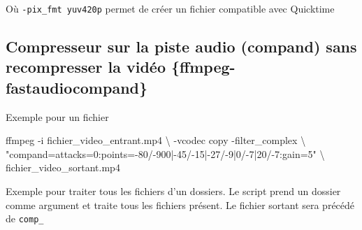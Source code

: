 \documentclass[
  french,
]{book}
\newenvironment{Shaded}{\begin{snugshade}}{\end{snugshade}}
\newcommand{\AttributeTok}[1]{\textcolor[rgb]{0.77,0.63,0.00}{#1}}
\newcommand{\BuiltInTok}[1]{#1}
\newcommand{\ControlFlowTok}[1]{\textcolor[rgb]{0.13,0.29,0.53}{\textbf{#1}}}
\newcommand{\DataTypeTok}[1]{\textcolor[rgb]{0.13,0.29,0.53}{#1}}
\newcommand{\ExtensionTok}[1]{#1}
\newcommand{\FunctionTok}[1]{\textcolor[rgb]{0.00,0.00,0.00}{#1}}
\newcommand{\KeywordTok}[1]{\textcolor[rgb]{0.13,0.29,0.53}{\textbf{#1}}}
\newcommand{\NormalTok}[1]{#1}
\newcommand{\OtherTok}[1]{\textcolor[rgb]{0.56,0.35,0.01}{#1}}
\newcommand{\PreprocessorTok}[1]{\textcolor[rgb]{0.56,0.35,0.01}{\textit{#1}}}
\newcommand{\StringTok}[1]{\textcolor[rgb]{0.31,0.60,0.02}{#1}}
\newcommand{\VariableTok}[1]{\textcolor[rgb]{0.00,0.00,0.00}{#1}}
\begin{document}
Où \texttt{-pix\_fmt\ yuv420p} permet de créer un fichier compatible avec Quicktime

\hypertarget{compresseur-sur-la-piste-audio-compand-sans-recompresser-la-viduxe9o-ffmpeg-fastaudiocompand}{%
\subsection{Compresseur sur la piste audio (compand) sans recompresser la vidéo \{ffmpeg-fastaudiocompand\}}\label{compresseur-sur-la-piste-audio-compand-sans-recompresser-la-viduxe9o-ffmpeg-fastaudiocompand}}

Exemple pour un fichier

\begin{Shaded}
\begin{Highlighting}[]
 \ExtensionTok{ffmpeg} \AttributeTok{{-}i}\NormalTok{ fichier\_video\_entrant.mp4 }\DataTypeTok{\textbackslash{}}
 \AttributeTok{{-}vcodec}\NormalTok{ copy  }\AttributeTok{{-}filter\_complex} \DataTypeTok{\textbackslash{}}
 \StringTok{"compand=attacks=0:points={-}80/{-}900|{-}45/{-}15|{-}27/{-}9|0/{-}7|20/{-}7:gain=5"} \DataTypeTok{\textbackslash{}}
\NormalTok{ fichier\_video\_sortant.mp4}
\end{Highlighting}
\end{Shaded}

Exemple pour traiter tous les fichiers d'un dossiers.
Le script prend un dossier comme argument et traite tous les fichiers présent.
Le fichier sortant sera précédé de \texttt{comp\_}

\begin{Shaded}
\end{Shaded}
\end{document}
